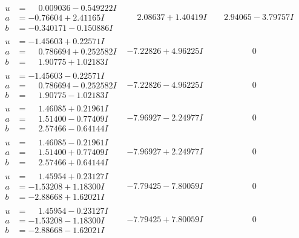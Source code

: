 \documentclass[1p]{elsarticle_modified}
\theoremstyle{definition}
\begin{document}
$$\begin{array}{c|c|c}
\begin{aligned}
u &= \phantom{-}0.009036 - 0.549222 I \\
a &= -0.76604 + 2.41165 I \\
b &= -0.340171 - 0.150886 I\end{aligned}
 & \phantom{-}2.08637 + 1.40419 I & \phantom{-}2.94065 - 3.79757 I \\ \hline\begin{aligned}
u &= -1.45603 + 0.22571 I \\
a &= \phantom{-}0.786694 + 0.252582 I \\
b &= \phantom{-}1.90775 + 1.02183 I\end{aligned}
 & -7.22826 + 4.96225 I & \phantom{-0.000000 } 0 \\ \hline\begin{aligned}
u &= -1.45603 - 0.22571 I \\
a &= \phantom{-}0.786694 - 0.252582 I \\
b &= \phantom{-}1.90775 - 1.02183 I\end{aligned}
 & -7.22826 - 4.96225 I & \phantom{-0.000000 } 0 \\ \hline\begin{aligned}
u &= \phantom{-}1.46085 + 0.21961 I \\
a &= \phantom{-}1.51400 - 0.77409 I \\
b &= \phantom{-}2.57466 - 0.64144 I\end{aligned}
 & -7.96927 - 2.24977 I & \phantom{-0.000000 } 0 \\ \hline\begin{aligned}
u &= \phantom{-}1.46085 - 0.21961 I \\
a &= \phantom{-}1.51400 + 0.77409 I \\
b &= \phantom{-}2.57466 + 0.64144 I\end{aligned}
 & -7.96927 + 2.24977 I & \phantom{-0.000000 } 0 \\ \hline\begin{aligned}
u &= \phantom{-}1.45954 + 0.23127 I \\
a &= -1.53208 + 1.18300 I \\
b &= -2.88668 + 1.62021 I\end{aligned}
 & -7.79425 - 7.80059 I & \phantom{-0.000000 } 0 \\ \hline\begin{aligned}
u &= \phantom{-}1.45954 - 0.23127 I \\
a &= -1.53208 - 1.18300 I \\
b &= -2.88668 - 1.62021 I\end{aligned}
 & -7.79425 + 7.80059 I & \phantom{-0.000000 } 0\\

\end{array}$$
\end{document}
